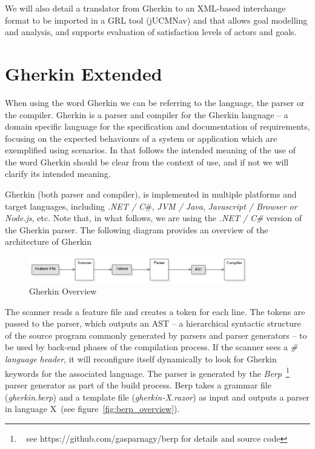 \documentclass[dissertation,final]{softeng}
\begin{document}
We will also detail a translator from Gherkin to an XML-based interchange format to be imported in a GRL tool (jUCMNav) and that allows goal modelling and analysis, and supports evaluation of satisfaction levels of actors and goals.

\section{Gherkin Extended}
\label{sec:gherkin_extended}
When using the word Gherkin we can be referring to the language, the parser or the compiler. Gherkin is a parser and compiler for the Gherkin language -- a domain specific language for the specification and documentation of requirements, focusing on the expected behaviours of a system or application which are exemplified using scenarios. In that follows the intended meaning of the use of the word Gherkin should be clear from the context of use, and if not we will clarify its intended meaning.

Gherkin (both parser and compiler), is implemented in multiple platforms and target languages, including \emph{.NET / C$\#$}, \emph{JVM / Java}, \emph{Javascript / Browser or Node.js}, etc. Note that, in what follows, we are using the \emph{.NET / C\#} version of the Gherkin parser. The following diagram provides an overview of the architecture of Gherkin

\begin{figure}[h!]
\includegraphics[width=0.85\textwidth]{gherkin_overview}
\centering
\caption[Gherkin Overview]{Gherkin Overview~\footnotemark}
\label{fig:gherkin_overview}
\end{figure}

The scanner reads a feature file and creates a token for each line. The tokens are passed to the parser, which outputs an AST -- a hierarchical syntactic structure of the source program commonly generated by parsers and parser generators -- to be used by back-end phases of the compilation process. If the scanner sees a \emph{\# language header}, it will reconfigure itself dynamically to look for Gherkin keywords for the associated language. The parser is generated by the \emph{Berp}~\footnote{~ see https://github.com/gasparnagy/berp for details and source code} parser generator as part of the build process. Berp takes a grammar file (\emph{gherkin.berp}) and a template file (\emph{gherkin-X.razor}) as input and outputs a parser in language X~(see figure~\ref{fig:berp_overview}).
\end{document}

